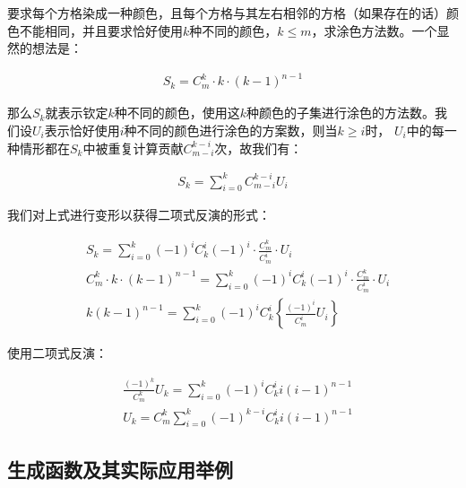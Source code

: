 \documentclass[UTF8]{book}
\begin{document}
要求每个方格染成一种颜色，且每个方格与其左右相邻的方格（如果存在的话）颜色不能相同，并且要求恰好使用$k$种不同的颜色，$k \le m$，求涂色方法数。一个显然的想法是：
\begin{large}
    \begin{equation}
        \begin{aligned}
            S_k = C_m^k \cdot k \cdot (k-1)^{n-1}
            \nonumber
        \end{aligned}
    \end{equation}
\end{large}
那么$S_k$就表示钦定$k$种不同的颜色，使用这$k$种颜色的子集进行涂色的方法数。我们设$U_i$表示恰好使用$i$种不同的颜色进行涂色的方案数，则当$k \ge i$时，
$U_i$中的每一种情形都在$S_k$中被重复计算贡献$C_{m-i}^{k-i}$次，故我们有：
\begin{large}
    \begin{equation}
        \begin{aligned}
            S_k = \sum_{i=0}^{k} C_{m-i}^{k-i} U_i
            \nonumber
        \end{aligned}
    \end{equation}
\end{large}
我们对上式进行变形以获得二项式反演的形式：
\begin{large}
    \begin{equation}
        \begin{aligned}
            &S_k = \sum_{i=0}^k (-1)^{i} C_k^i (-1)^{i} \cdot \frac{C_m^k}{C_m^i} \cdot U_i \\
            &C_m^k \cdot k \cdot (k-1)^{n-1} = \sum_{i=0}^k (-1)^{i} C_k^i (-1)^{i} \cdot \frac{C_m^k}{C_m^i} \cdot U_i \\
            &k(k-1)^{n-1}=\sum_{i=0}^k (-1)^{i} C_k^i \left \{ \frac{(-1)^{i}}{C_m^i}U_i \right \}
            \nonumber
        \end{aligned}
    \end{equation}
\end{large}
使用二项式反演：
\begin{large}
    \begin{equation}
        \begin{aligned}
            &\frac{(-1)^{k}}{C_m^k} U_k = \sum_{i=0}^k (-1)^{i} C_k^i i(i-1)^{n-1} \\
            &U_k = C_m^k \sum_{i=0}^k (-1)^{k-i} C_k^i i(i-1)^{n-1}
            \nonumber
        \end{aligned}
    \end{equation}
\end{large}

\subsection{生成函数及其实际应用举例}
\end{document}

